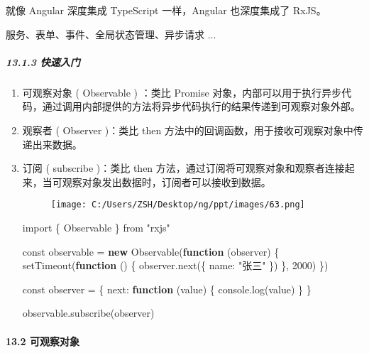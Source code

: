\documentclass[
]{article}
\newenvironment{Shaded}{}{}
\newcommand{\BuiltInTok}[1]{#1}
\newcommand{\DecValTok}[1]{\textcolor[rgb]{0.25,0.63,0.44}{#1}}
\newcommand{\FunctionTok}[1]{\textcolor[rgb]{0.02,0.16,0.49}{#1}}
\newcommand{\ImportTok}[1]{#1}
\newcommand{\KeywordTok}[1]{\textcolor[rgb]{0.00,0.44,0.13}{\textbf{#1}}}
\newcommand{\NormalTok}[1]{#1}
\newcommand{\OperatorTok}[1]{\textcolor[rgb]{0.40,0.40,0.40}{#1}}
\newcommand{\StringTok}[1]{\textcolor[rgb]{0.25,0.44,0.63}{#1}}
\begin{document}
就像 Angular 深度集成 TypeScript 一样，Angular 也深度集成了 RxJS。

服务、表单、事件、全局状态管理、异步请求 ...

\hypertarget{1313-ux5febux901fux5165ux95e8}{%
\subparagraph{13.1.3 快速入门}\label{1313-ux5febux901fux5165ux95e8}}

\begin{enumerate}
\def\labelenumi{\arabic{enumi}.}
\item
  可观察对象 ( Observable ) ：类比 Promise
  对象，内部可以用于执行异步代码，通过调用内部提供的方法将异步代码执行的结果传递到可观察对象外部。
\item
  观察者 ( Observer )：类比 then
  方法中的回调函数，用于接收可观察对象中传递出来数据。
\item
  订阅 ( subscribe )：类比 then
  方法，通过订阅将可观察对象和观察者连接起来，当可观察对象发出数据时，订阅者可以接收到数据。

  \begin{figure}
  \centering
  \texttt{[image: C:/Users/ZSH/Desktop/ng/ppt/images/63.png]}
  \caption{}
  \end{figure}

\begin{Shaded}
\begin{Highlighting}[]
\ImportTok{import}\NormalTok{ \{ Observable \} from }\StringTok{"rxjs"}

\NormalTok{const observable }\OperatorTok{=} \KeywordTok{new} \FunctionTok{Observable}\NormalTok{(}\KeywordTok{function}\NormalTok{ (observer) \{}
  \FunctionTok{setTimeout}\NormalTok{(}\KeywordTok{function}\NormalTok{ () \{}
\NormalTok{    observer}\OperatorTok{.}\FunctionTok{next}\NormalTok{(\{}
\NormalTok{      name}\OperatorTok{:} \StringTok{"张三"}
\NormalTok{    \})}
\NormalTok{  \}}\OperatorTok{,} \DecValTok{2000}\NormalTok{)}
\NormalTok{\})}

\NormalTok{const observer }\OperatorTok{=}\NormalTok{ \{}
\NormalTok{  next}\OperatorTok{:} \KeywordTok{function}\NormalTok{ (value) \{}
    \BuiltInTok{console}\OperatorTok{.}\FunctionTok{log}\NormalTok{(value)}
\NormalTok{  \}}
\NormalTok{\}}

\NormalTok{observable}\OperatorTok{.}\FunctionTok{subscribe}\NormalTok{(observer)}
\end{Highlighting}
\end{Shaded}
\end{enumerate}

\hypertarget{132-ux53efux89c2ux5bdfux5bf9ux8c61}{%
\paragraph{13.2 可观察对象}\label{132-ux53efux89c2ux5bdfux5bf9ux8c61}}
\end{document}
